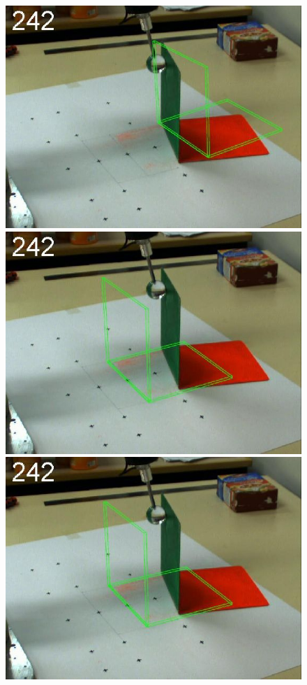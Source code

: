 \begin{figure}[tb]
{\includegraphics[width=\imgBXwid]{./B2_2exp_58_4}
\includegraphics[width=\imgBXwid]{./B2_1exp_58_4}
\includegraphics[width=\imgBXwid]{./B2_LWPR1_58_4}
}
\end{figure}
